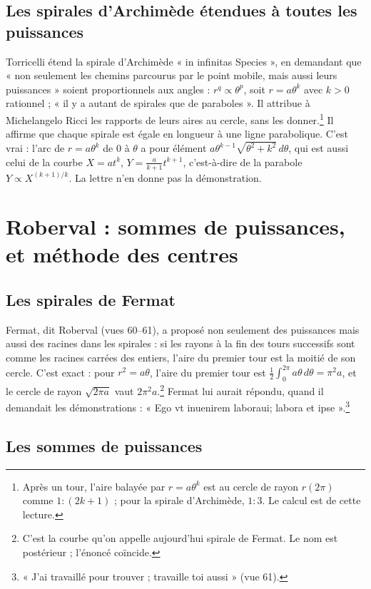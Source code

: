 \documentclass[11pt,a4paper]{article}
\begin{document}
\subsection*{Les spirales d'Archimède étendues à toutes les puissances}

Torricelli étend la spirale d'Archimède « in infinitas Species », en demandant
que « non seulement les chemins parcourus par le point mobile, mais aussi leurs
puissances » soient proportionnels aux angles : $r^q \propto \theta^p$, soit
$r = a\theta^k$ avec $k>0$ rationnel ; « il y a autant de spirales que de
paraboles ». Il attribue à Michelangelo Ricci les rapports de leurs aires au
cercle, sans les donner.\footnote{Après un tour, l'aire balayée par $r=a\theta^k$
est au cercle de rayon $r(2\pi)$ comme $1:(2k+1)$ ; pour la spirale d'Archimède,
$1:3$. Le calcul est de cette lecture.} Il affirme que chaque spirale est égale en
longueur à une ligne parabolique. C'est vrai : l'arc de $r=a\theta^k$ de
$0$ à $\theta$ a pour élément $a\theta^{k-1}\sqrt{\theta^2+k^2}\,d\theta$, qui est
aussi celui de la courbe $X = at^k$, $Y = \frac{a}{k+1}t^{k+1}$, c'est-à-dire de
la parabole $Y\propto X^{(k+1)/k}$. La lettre n'en donne pas la démonstration.

\section*{Roberval : sommes de puissances, et méthode des centres}

\subsection*{Les spirales de Fermat}

Fermat, dit Roberval (vues 60--61), a proposé non seulement des puissances mais
aussi des racines dans les spirales : si les rayons à la fin des tours successifs
sont comme les racines carrées des entiers, l'aire du premier tour est la moitié
de son cercle. C'est exact : pour $r^2 = a\theta$, l'aire du premier tour est
$\tfrac12\int_0^{2\pi}a\theta\,d\theta = \pi^2a$, et le cercle de rayon
$\sqrt{2\pi a}$ vaut $2\pi^2a$.\footnote{C'est la courbe qu'on appelle aujourd'hui
spirale de Fermat. Le nom est postérieur ; l'énoncé coïncide.} Fermat lui aurait
répondu, quand il demandait les démonstrations : « Ego vt inuenirem laboraui;
labora et ipse ».\footnote{« J'ai travaillé pour trouver ; travaille toi aussi »
(vue 61).}

\subsection*{Les sommes de puissances}
\end{document}
